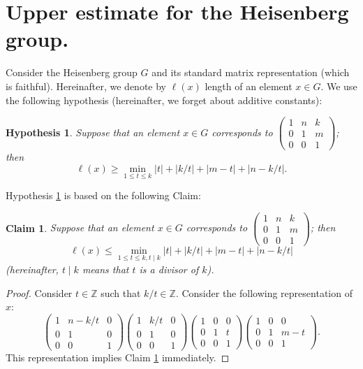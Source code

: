 \documentclass[11pt]{article}
\newcounter{razdel}[section]
\theoremstyle{Mystyle}
\newtheorem{Claim}[razdel]{Claim}
\newtheorem{Hypothesis}[razdel]{Hypothesis}
\begin{document}
\section{Upper estimate for the Heisenberg group.}

Consider the Heisenberg group $G$ and its standard matrix representation (which is faithful).  %
Hereinafter, we denote by $\ell(x)$ length of an element $x\in G$.
We use the following hypothesis (hereinafter, we forget about additive constants):

\begin{Hypothesis}
\label{Hyp}
Suppose that
an element $x\in G$ corresponds to $\left(\begin{array}{ccc} 1& n & k\\ 0 & 1 & m\\ 0 & 0 & 1 \end{array}\right)$; then
\begin{equation}
\label{HypForm}
\ell(x)\geq \min_{1\leq t\leq k} |t| + |k/t| + |m-t| + |n - k/t|.
\end{equation}
\end{Hypothesis}

Hypothesis \ref{Hyp} is based on the following Claim:
\begin{Claim}
\label{Cl3}
Suppose that
an element $x\in G$ corresponds to $\left(\begin{array}{ccc} 1& n & k\\ 0 & 1 & m\\ 0 & 0 & 1 \end{array}\right)$; then
$$\ell(x)\leq \min_{1\leq t\leq k, t\mid k} |t| + |k/t| + |m-t| + |n - k/t|$$
(hereinafter, $t\mid k$ means that $t$ is a divisor of $k$).
\end{Claim}

\begin{proof}
Consider $t\in\mathbb{Z}$ such that $k/t\in\mathbb{Z}$. Consider the following representation of~$x$:
$$
\left(\begin{array}{ccc} 1& n-k/t & 0\\ 0 & 1 & 0\\ 0 & 0 & 1 \end{array}\right)
\left(\begin{array}{ccc} 1& k/t & 0\\ 0 & 1 & 0\\ 0 & 0 & 1 \end{array}\right)
\left(\begin{array}{ccc} 1& 0 & 0\\ 0 & 1 & t\\ 0 & 0 & 1 \end{array}\right)
\left(\begin{array}{ccc} 1& 0 & 0\\ 0 & 1 & m-t\\ 0 & 0 & 1 \end{array}\right)
.
$$
This representation implies Claim \ref{Cl3} immediately.
\end{proof}
\end{document}
